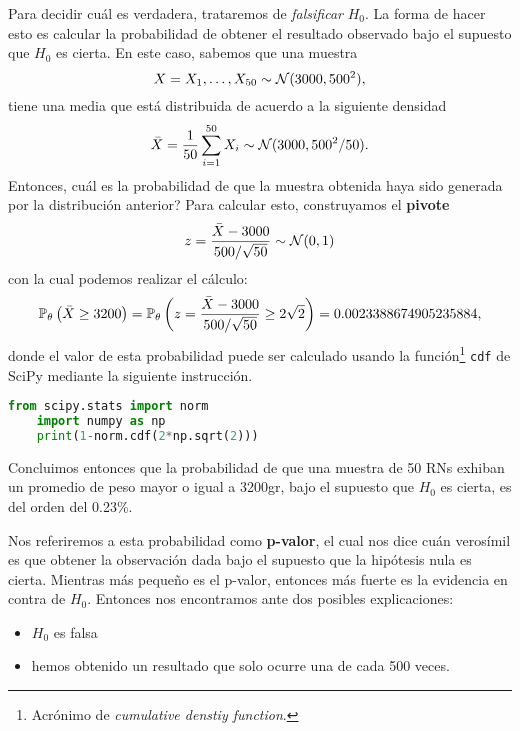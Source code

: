 Para decidir cuál es verdadera, trataremos de \emph{falsificar} $H_0$. La forma de hacer esto es calcular la probabilidad de obtener el resultado observado bajo el supuesto que $H_0$ es cierta. En este caso, sabemos que una muestra 
\begin{equation}
	X = X_1,\ldots,X_{50}\sim{\mathcal N}(3000,500^2),
\end{equation}
tiene una media que está distribuida de acuerdo a la siguiente densidad 
\begin{equation}
	\bar{X} = \frac{1}{50} \sum_{i=1}^{50} X_i \sim {\mathcal N}(3000,500^2/50).
\end{equation}
Entonces, cuál es la probabilidad de que la muestra obtenida haya sido generada por la distribución anterior? Para calcular esto, construyamos el \textbf{pivote} 
\begin{equation}
	z = \frac{\bar{X}-3000}{500/\sqrt{50}}\sim{\mathcal N}(0,1)
\end{equation}
con la cual podemos realizar el cálculo:
\begin{equation}
	\mathbb{P}_\theta \left(\bar{X}\geq 3200\right) = \mathbb{P}_\theta \left(z = \frac{\bar{X}-3000}{500/\sqrt{50}}\geq 2\sqrt{2}\right) = 0.0023388674905235884,
\end{equation}
donde el valor de esta probabilidad puede ser calculado usando la función\footnote{Acrónimo de \textit{cumulative denstiy function}.} \texttt{cdf} de SciPy mediante la siguiente instrucción. 
\begin{lstlisting}[language=Python]
	from scipy.stats import norm
	import numpy as np
	print(1-norm.cdf(2*np.sqrt(2)))
\end{lstlisting}
Concluimos entonces que la probabilidad de que una muestra de 50 RNs exhiban un promedio de peso mayor o igual a 3200gr, bajo el supuesto que $H_0$ es cierta, es del orden del 0.23\%. 

Nos referiremos a esta probabilidad como \textbf{p-valor}, el cual nos dice cuán verosímil es que obtener la observación dada bajo el supuesto que la hipótesis nula es cierta. Mientras más pequeño es el p-valor, entonces más fuerte es la evidencia en contra de $H_0$. Entonces nos encontramos ante dos posibles explicaciones: 
\begin{itemize}
 	\item $H_0$ es falsa
 	\item hemos obtenido un resultado que solo ocurre una de cada 500 veces. 
 \end{itemize} 

\begin{remark}
	
\end{remark}

